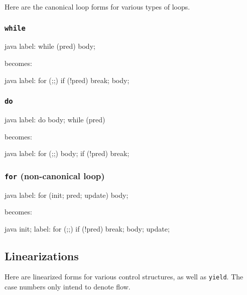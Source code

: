 \documentclass[journal,a4paper]{IEEEtran}
\begin{document}
Here are the canonical loop forms for various types of loops.

\subsubsection{\texttt{while}}

\begin{pygmented}{java}
label: while (pred) {
    body;
}
\end{pygmented}

becomes:

\begin{pygmented}{java}
label: for (;;) {
    if (!pred) break; body;
}
\end{pygmented}

\subsubsection{\texttt{do}}

\begin{pygmented}{java}
label: do {
    body;
} while (pred)
\end{pygmented}

becomes:

\begin{pygmented}{java}
label: for (;;) {
    body; if (!pred) break;
}
\end{pygmented}

\subsubsection{\texttt{for} (non-canonical loop)}

\begin{pygmented}{java}
label: for (init; pred; update) {
    body;
}
\end{pygmented}

becomes:

\begin{pygmented}{java}
{
    init;
    label: for (;;) {
        if (!pred) break; body;
        update;
    }
}
\end{pygmented}

\subsection{Linearizations} \label{appendix:linearizations}

Here are linearized forms for various control structures, as well as \texttt{yield}. The case
numbers only intend to denote flow.
\end{document}
